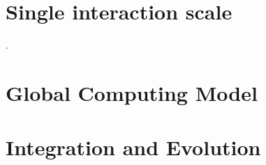 \documentclass{dune} %
\begin{document}
\part{Single interaction  scale}\label{part:event} %


. %
\cleardoublepage


\cleardoublepage

\cleardoublepage

\cleardoublepage

\part{Global Computing Model  }\label{part:model} %

\cleardoublepage


\cleardoublepage


\cleardoublepage

\cleardoublepage



\cleardoublepage


\cleardoublepage


\cleardoublepage


%


%

%

%


\part{Integration and Evolution}
\end{document}
